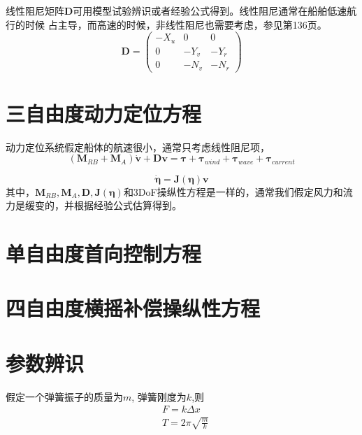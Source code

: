 线性阻尼矩阵$\bm{D}$可用模型试验辨识或者经验公式得到。线性阻尼通常在船舶低速航行的时候
占主导，而高速的时候，非线性阻尼也需要考虑，参见\cite{fossen2011handbook}第136页。
\begin{equation}
  \label{eq:lineardampingmatrix}
  \bm{D}=\begin{pmatrix}
            -X_{u} & 0 & 0 \\
            0 & -Y_{v} & -Y_r \\
            0 & -N_v & -N_r
          \end{pmatrix}
\end{equation}


\section{三自由度动力定位方程}
动力定位系统假定船体的航速很小，通常只考虑线性阻尼项，
\begin{equation}
  \label{eq:3dofdp}
  (\bm{M}_{RB}+\bm{M}_A) \dot{\bm{v}}+\bm{D}\bm{v}=\bm{\tau}+\bm{\tau}_{wind}+
  \bm{\tau}_{wave}+\bm{\tau}_{current}
\end{equation}

\begin{equation}
  \label{eq:3doftransformdp}
  \dot{\bm{\eta}}=\bm{J}(\bm{\eta})\bm{v}
\end{equation}
其中，$\bm{M}_{RB},\bm{M}_A, \bm{D}, \bm{J}(\bm{\eta})$和3DoF操纵性方程是一样的，通常我们假定风力和流力是缓变的，并根据经验公式估算得到。
\section{单自由度首向控制方程}




\section{四自由度横摇补偿操纵性方程}


\section{参数辨识}

假定一个弹簧振子的质量为$m$, 弹簧刚度为$k$,则
\begin{equation}
  \begin{aligned}
    &F=k \Delta x \\
    &T= 2 \pi \sqrt{\frac{m}{k}}
  \end{aligned}
\end{equation}

